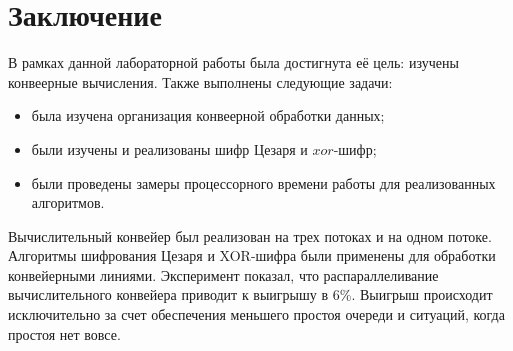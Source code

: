 \section*{\large Заключение}
    \par В рамках данной лабораторной работы была достигнута её цель: изучены конвеерные вычисления. Также выполнены следующие задачи:
    \begin{itemize}
    	\item была изучена организация конвеерной обработки данных;
		\item были изучены и реализованы шифр Цезаря и $xor$-шифр;
		\item были проведены замеры процессорного времени работы для реализованных алгоритмов.
	\end{itemize}
	\par Вычислительный конвейер был реализован на трех потоках и на одном потоке. Алгоритмы шифрования Цезаря и XOR-шифра были применены для обработки конвейерными линиями. Эксперимент показал, что распараллеливание вычислительного конвейера приводит к выигрышу в 6\%. Выигрыш происходит исключительно за счет обеспечения меньшего простоя очереди и ситуаций, когда простоя нет вовсе.
\newpage

